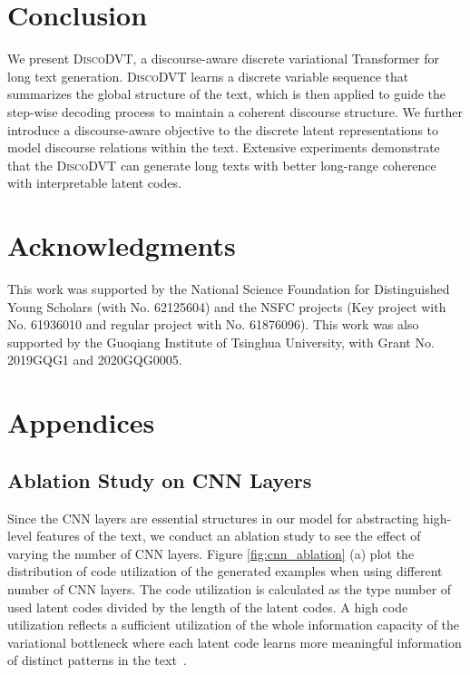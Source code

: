 \documentclass[11pt]{article}
\begin{document}
\section{Conclusion}

We present \textsc{DiscoDVT}, a discourse-aware discrete variational Transformer for long text generation. \textsc{DiscoDVT} learns a discrete variable sequence that summarizes the global structure of the text, which is then applied to guide the step-wise decoding process to maintain a coherent discourse structure. We further introduce a discourse-aware objective to the discrete latent representations to model discourse relations within the text. Extensive experiments demonstrate that the \textsc{DiscoDVT} can generate long texts with better long-range coherence with interpretable latent codes.


\section*{Acknowledgments}

This work was supported by the National Science Foundation for Distinguished Young Scholars (with No. 62125604) and the NSFC projects (Key project with No. 61936010 and regular project with No. 61876096). This work was also supported by the Guoqiang Institute of Tsinghua University, with Grant No. 2019GQG1 and 2020GQG0005.






\clearpage
\appendix

\section{Appendices}

\subsection{Ablation Study on CNN Layers}\label{sec:cnn_ablation}




Since the CNN layers are essential structures in our model for abstracting high-level features of the text, we conduct an ablation study to see the effect of varying the number of CNN layers. Figure \ref{fig:cnn_ablation} (a) plot the distribution of code utilization of the generated examples when using different number of CNN layers. The code utilization is calculated as the type number of used latent codes divided by the length of the latent codes. A high code utilization reflects a sufficient utilization of the whole information capacity of the variational bottleneck where each latent code learns more meaningful information of distinct patterns in the text~\citep{DBLP:conf/icml/KaiserBRVPUS18}.
\end{document}

